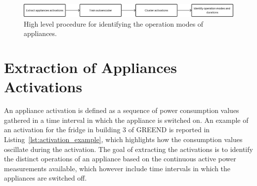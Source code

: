 \begin{figure}
    \centering
    \includegraphics[width=\linewidth]{images/high_level_procedure.png}
    \caption{High level procedure for identifying the operation modes of appliances.}
    \label{fig:high_level_procedure}
\end{figure}

\section{Extraction of Appliances Activations}

An appliance activation is defined as a sequence of power consumption values gathered in a time interval in which the appliance is switched on. An example of an activation for the fridge in building 3 of GREEND is reported in Listing~\ref{lst:activation_example}, which highlights how the consumption values oscillate during the activation. The goal of extracting the activations is to identify the distinct operations of an appliance based on the continuous active power measurements available, which however include time intervals in which the appliances are switched off.


